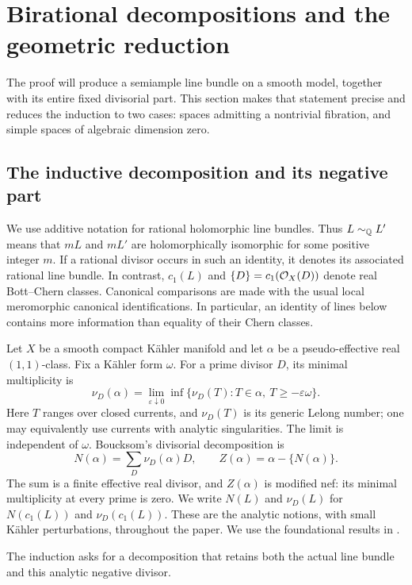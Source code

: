 \section{Birational decompositions and the geometric reduction}
\label{sec:inductive-reduction}

The proof will produce a semiample line bundle on a smooth model, together
with its entire fixed divisorial part. This section makes that statement
precise and reduces the induction to two cases: spaces admitting a
nontrivial fibration, and simple spaces of algebraic dimension zero.

\subsection{The inductive decomposition and its negative part}

We use additive notation for rational holomorphic line bundles. Thus
\(L\sim_{\mathbb Q}L'\) means that \(mL\) and \(mL'\) are holomorphically
isomorphic for some positive integer \(m\). If a rational divisor occurs in such
an identity, it denotes its associated rational line bundle. In contrast,
\(c_1(L)\) and \(\{D\}=c_1(\mathcal O_X(D))\) denote real Bott--Chern classes.
Canonical comparisons are made with the usual local meromorphic canonical
identifications. In particular, an identity of lines below contains more
information than equality of their Chern classes.

Let \(X\) be a smooth compact Kähler manifold and let \(\alpha\) be a
pseudo-effective real \((1,1)\)-class. Fix a Kähler form \(\omega\). For a
prime divisor \(D\), its minimal multiplicity is
\[
 \nu_D(\alpha)=\lim_{\varepsilon\downarrow0}
 \inf\bigl\{\nu_D(T):T\in\alpha,\ T\geq-\varepsilon\omega\bigr\}.
\]
Here \(T\) ranges over closed currents, and \(\nu_D(T)\) is its generic
Lelong number; one may equivalently use currents with analytic singularities.
The limit is independent of \(\omega\). Boucksom's divisorial decomposition
is
\[
 N(\alpha)=\sum_D\nu_D(\alpha)D,
 \qquad Z(\alpha)=\alpha-\{N(\alpha)\}.
\]
The sum is a finite effective real divisor, and \(Z(\alpha)\) is modified
nef: its minimal multiplicity at every prime is zero. We write \(N(L)\) and
\(\nu_D(L)\) for \(N(c_1(L))\) and \(\nu_D(c_1(L))\). These are the
analytic notions, with small Kähler
perturbations, throughout the paper. We use the foundational results in
\cite[Sections~2--3 and~5]{Boucksom2004}.

The induction asks for a decomposition that retains both the actual line
bundle and this analytic negative divisor.

